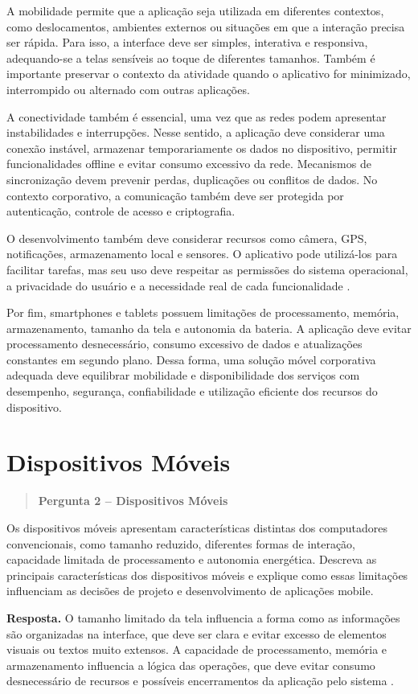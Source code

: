 \documentclass[
    12pt,
    oneside,
    a4paper,
    brazil
]{abntex2}
\newcommand{\pergunta}[2]{%
\begin{quote}
\noindent\textbf{Pergunta #1 -- #2}
\end{quote}}
\newcommand{\resposta}{%
\par\noindent\textbf{Resposta.}\hspace{0.3em}
}
\begin{document}
A mobilidade permite que a aplicação seja utilizada em diferentes contextos, como deslocamentos, ambientes externos ou situações em que a interação precisa ser rápida. Para isso, a interface deve ser simples, interativa e responsiva, adequando-se a telas sensíveis ao toque de diferentes tamanhos. Também é importante preservar o contexto da atividade quando o aplicativo for minimizado, interrompido ou alternado com outras aplicações. 

A conectividade também é essencial, uma vez que as redes podem apresentar instabilidades e interrupções. Nesse sentido, a aplicação deve considerar uma conexão instável, armazenar temporariamente os dados no dispositivo, permitir funcionalidades offline e evitar consumo excessivo da rede. Mecanismos de sincronização devem prevenir perdas, duplicações ou conflitos de dados. No contexto corporativo, a comunicação também deve ser protegida por autenticação, controle de acesso e criptografia. 

O desenvolvimento também deve considerar recursos como câmera, GPS, notificações, armazenamento local e sensores. O aplicativo pode utilizá-los para facilitar tarefas, mas seu uso deve respeitar as permissões do sistema operacional, a privacidade do usuário e a necessidade real de cada funcionalidade \cite{androidPermissions,applePrivacy}. 

Por fim, smartphones e tablets possuem limitações de processamento, memória, armazenamento, tamanho da tela e autonomia da bateria. A aplicação deve evitar processamento desnecessário, consumo excessivo de dados e atualizações constantes em segundo plano. Dessa forma, uma solução móvel corporativa adequada deve equilibrar mobilidade e disponibilidade dos serviços com desempenho, segurança, confiabilidade e utilização eficiente dos recursos do dispositivo.

\section{Dispositivos Móveis}
\pergunta{2}{Dispositivos Móveis}

Os dispositivos móveis apresentam características distintas dos computadores convencionais, como tamanho reduzido, diferentes formas de interação, capacidade limitada de processamento e autonomia energética. Descreva as principais características dos dispositivos móveis e explique como essas limitações influenciam as decisões de projeto e desenvolvimento de aplicações mobile.

\resposta O tamanho limitado da tela influencia a forma como as informações são organizadas na interface, que deve ser clara e evitar excesso de elementos visuais ou textos muito extensos. A capacidade de processamento, memória e armazenamento influencia a lógica das operações, que deve evitar consumo desnecessário de recursos e possíveis encerramentos da aplicação pelo sistema \cite{androidMemory,forman1994}.
\end{document}
